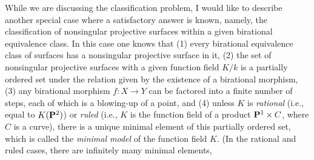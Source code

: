 {\medskip
While we are discussing the classification problem, I would like to describe another special case where a satisfactory answer is known, namely, the classification of nonsingular projective surfaces within a given birational equivalence class. In this case one knows that (1) every birational equivalence class of surfaces has a nonsingular projective surface in it, (2) the set of nonsingular projective surfaces with a given function field $K/k$ is a partially ordered set under the relation given by the existence of a birational morphism, (3) any birational morphism $f\colon X\to Y$ can be factored into a finite number of steps, each of which is a blowing-up of a point, and (4) unless $K$ is \emph{rational} (i.e., equal to $K(\mathbf{P}^2)$) or \emph{ruled} (i.e., $K$ is the function field of a product $\mathbf{P}^1\times C$, where $C$ is a curve), there is a unique minimal element of this partially ordered set, which is called the \emph{minimal model} of the function field $K$. (In the rational and ruled cases, there are infinitely many minimal elements,}
